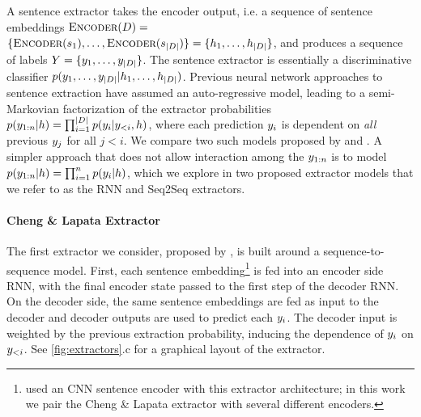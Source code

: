A sentence extractor takes the encoder output, i.e. 
a sequence of sentence embeddings
$\textsc{Encoder}(D) =$ $\{\textsc{Encoder}(s_1), \ldots, \textsc{Encoder}(s_{|D|})\} =
\{h_1, \ldots, h_{|D|}\}$, and produces a sequence of labels
$Y = \{y_1, \ldots, y_{|D|}\}$. 
The sentence extractor is essentially a discriminative
classifier $p(y_1,\ldots,y_{|D|} | h_1,\ldots,h_{|D|})$.
Previous neural network approaches to sentence extraction have assumed
an auto-regressive model, leading to a semi-Markovian
factorization of the extractor probabilities
$p(y_{1:n}|h)=\prod_{i=1}^{|D|} 
p(y_i|y_{<i},h)$,
where each prediction $y_i$ is dependent on \emph{all}
previous $y_j$ for
all $j < i$. We compare two such models proposed by \cite{cheng2016neural}
and \cite{nallapati2017summarunner}.
A simpler approach that does not allow interaction among the $y_{1:n}$
is to
  model $p(y_{1:n}|h) = \prod_{i=1}^n p(y_i|h)$,
  which we explore in two proposed extractor models that we refer to as the RNN 
  and Seq2Seq extractors.


\paragraph{Cheng \& Lapata Extractor} 
 The first extractor we consider, proposed by 
\citet{cheng2016neural}, %
is built around a sequence-to-sequence model.
First, each sentence embedding\footnote{\citet{cheng2016neural} used an CNN sentence encoder with 
this extractor architecture; in this work we pair the Cheng \& Lapata extractor
with several different encoders.} is
fed into an encoder side RNN, with the final encoder state passed to the
first step of the decoder RNN. On the decoder side, the same sentence 
embeddings are fed as input to the decoder and decoder outputs are used to
predict each $y_i$. The decoder input is weighted by the previous extraction
probability, inducing the dependence of $y_i$ on $y_{<i}$.
See \autoref{fig:extractors}.c for a graphical layout of the extractor.


